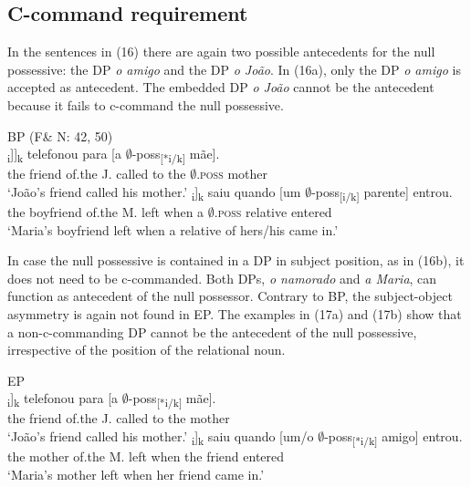 \documentclass[output=paper]{langsci/langscibook}
\begin{document}
\subsection{C-command requirement}%

In the sentences in (16) there are again two possible antecedents for the null possessive: the DP \textit{o amigo} and the DP \textit{o João}. In (16a), only the DP \textit{o amigo} is accepted as antecedent. The embedded DP \textit{o João} cannot be the antecedent because it fails to c-command the null possessive.

\ea%
    BP (F\& N: 42, 50)\label{ex:wein:16}\\
    \ea
    \gll\relax [O amigo [d[o João]\textsubscript{i}]]\textsubscript{k} telefonou para [a $\emptyset$-poss\textsubscript{[}\textsubscript{*i/k]} mãe].\\
         the friend of.the J. called to the $\emptyset$\textsc{.poss} mother\\
    \glt ‘João’s friend called his mother.’
    \ex  
    \gll\relax [O namorado d[a Maria]\textsubscript{i}]\textsubscript{k} saiu quando [um $\emptyset$-poss\textsubscript{[i/}\textsubscript{k]} parente] entrou.\\
         the boyfriend of.the M. left when a $\emptyset$\textsc{.poss} relative entered\\
    \glt ‘Maria’s boyfriend left when a relative of hers/his came in.’
    \z
\z

In case the null possessive is contained in a DP in subject position, as in (16b), it does not need to be c-commanded. Both DPs, \textit{o namorado} and \textit{a Maria}, can function as antecedent of the null possessor. Contrary to BP, the subject-object asymmetry is again not found in EP. The examples in (17a) and (17b) show that a non-c-commanding DP cannot be the antecedent of the null possessive, irrespective of the position of the relational noun.

\ea%
    EP\label{ex:wein:17}\\
    \ea
    \gll [O amigo d[o João]\textsubscript{i}]\textsubscript{k} telefonou para [a $\emptyset$-poss\textsubscript{[*}\textsubscript{i/k]} mãe].\\
         the friend of.the J. called to the mother\\
    \glt ‘João’s friend called his mother.’
    \ex  
    \gll [A mãe d[a Maria]\textsubscript{i}]\textsubscript{k} saiu quando [um/o $\emptyset$-poss\textsubscript{[*i/k]} amigo] entrou. \\
         the mother of.the M. left when the friend entered \\
    \glt ‘Maria’s mother left when her friend came in.’ 
    \z
\z
\end{document}

